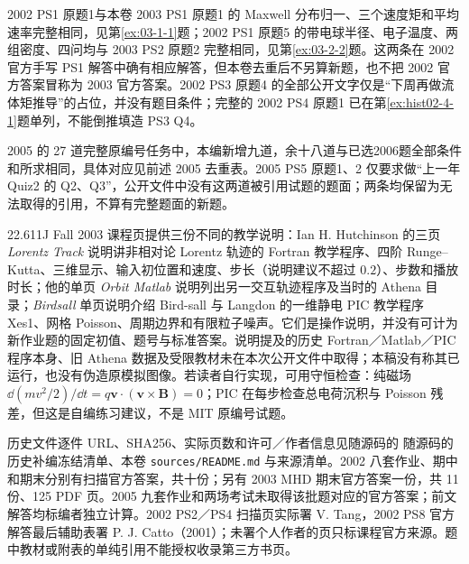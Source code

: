 2002 PS1 原题1与本卷 2003 PS1 原题1 的 Maxwell 分布归一、三个速度矩和平均速率完整相同，见第\ref{ex:03-1-1}题；2002 PS1 原题5 的带电球半径、电子温度、两组密度、四问均与 2003 PS2 原题2 完整相同，见第\ref{ex:03-2-2}题。这两条在 2002 官方手写 PS1 解答中确有相应解答，但本卷去重后不另算新题，也不把 2002 官方答案冒称为 2003 官方答案。2002 PS3 原题4 的全部公开文字仅是“下周再做流体矩推导”的占位，并没有题目条件；完整的 2002 PS4 原题1 已在第\ref{ex:hist02-4-1}题单列，不能倒推填造 PS3 Q4。

2005 的 27 道完整原编号任务中，本编新增九道，余十八道与已选2006题全部条件和所求相同，具体对应见前述 2005 去重表。2005 PS5 原题1、2 仅要求做“上一年 Quiz2 的 Q2、Q3”，公开文件中没有这两道被引用试题的题面；两条均保留为无法取得的引用，不算有完整题面的新题。

22.611J Fall 2003 课程页提供三份不同的教学说明：Ian H. Hutchinson 的三页 \textit{Lorentz Track} 说明讲非相对论 Lorentz 轨迹的 Fortran 教学程序、四阶 Runge--Kutta、三维显示、输入初位置和速度、步长（说明建议不超过 $0.2$）、步数和播放时长；他的单页 \textit{Orbit Matlab} 说明列出另一交互轨迹程序及当时的 Athena 目录；\textit{Birdsall} 单页说明介绍 Bird-sall 与 Langdon 的一维静电 PIC 教学程序 Xes1、网格 Poisson、周期边界和有限粒子噪声。它们是操作说明，并没有可计为新作业题的固定初值、题号与标准答案。说明提及的历史 Fortran／Matlab／PIC 程序本身、旧 Athena 数据及受限教材未在本次公开文件中取得；本稿没有称其已运行，也没有伪造原模拟图像。若读者自行实现，可用守恒检查：纯磁场 $\dd(mv^2/2)/\dd t=q\mathbf v\cdot(\mathbf v\times\mathbf B)=0$；PIC 在每步检查总电荷沉积与 Poisson 残差，但这是自编练习建议，不是 MIT 原编号试题。

历史文件逐件 URL、SHA256、实际页数和许可／作者信息见随源码的 随源码的历史补编冻结清单、本卷 \texttt{sources/README.md} 与来源清单。2002 八套作业、期中和期末分别有扫描官方答案，共十份；另有 2003 MHD 期末官方答案一份，共 11 份、125 PDF 页。2005 九套作业和两场考试未取得该批题对应的官方答案；前文解答均标编者独立计算。2002 PS2／PS4 扫描页实际署 V. Tang，2002 PS8 官方解答最后辅助表署 P. J. Catto（2001）；未署个人作者的页只标课程官方来源。题中教材或附表的单纯引用不能授权收录第三方书页。
